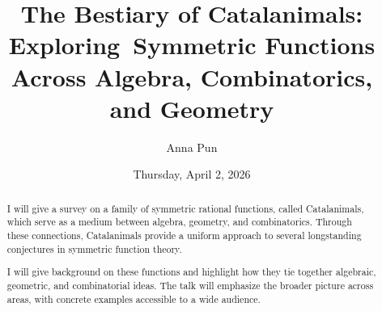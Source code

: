 \documentclass{UAmathtalk}
\author{Anna Pun}
\title{The Bestiary of Catalanimals: Exploring~Symmetric Functions Across Algebra, Combinatorics, and Geometry}
\date{Thursday, April 2, 2026}
\begin{document}
\maketitle

\begin{abstract}
I will give a survey on a family of symmetric rational functions, called Catalanimals, which serve as a medium between algebra, geometry, and combinatorics. Through these connections, Catalanimals provide a uniform approach to several longstanding conjectures in symmetric function theory.

I will give background on these functions and highlight how they tie together algebraic, geometric, and combinatorial ideas. The talk will emphasize the broader picture across areas, with concrete examples accessible to a wide audience.
\end{abstract}
\end{document}
